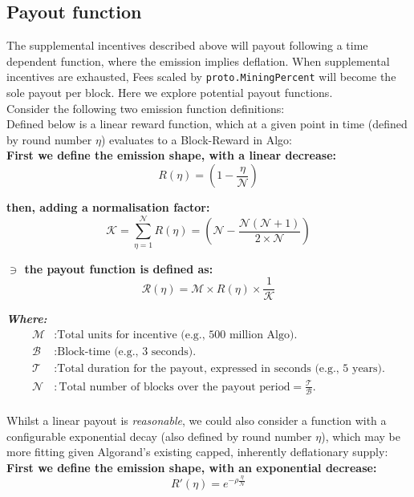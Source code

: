 \documentclass[11pt,a4paper]{article}
\begin{document}
\pagebreak

\subsection{Payout function}
The supplemental incentives described above will payout following a time dependent function, where the emission implies 
deflation. When supplemental incentives are exhausted, Fees scaled by \texttt{proto.MiningPercent} will become the sole 
payout per block. Here we explore potential payout functions. \\

Consider the following two emission function definitions: \\

Defined below is a linear reward function, which at a given point in time (defined by round number $\eta$) evaluates to 
a \gls{Block-Reward} in Algo:\\

\textbf{First we define the emission shape, with a linear decrease:}
\[
R(\eta) = (1- \frac{\eta}{\mathcal{N}})
\]

\textbf{then, adding a normalisation factor:}
\[
\mathcal{K} = \sum_{\eta=1}^\mathcal{N}R(\eta)=(\mathcal{N} -  \frac{\mathcal{N}(\mathcal{N}+1)}{2\times \mathcal{N}})  
\]

\textbf{$\ni$ the payout function is defined as:}
\[
\mathcal{R}(\eta) = \mathcal{M} \times R(\eta) \times \frac{1}{\mathcal{K}}
\]

\textbf{\emph{Where:}}
\begin{align*}
    \mathcal{M} & : \text{Total units for incentive (e.g., 500 million Algo).} \\
    \mathcal{B} & : \text{Block-time (e.g., 3 seconds).} \\
    \mathcal{T} & : \text{Total duration for the payout, expressed in seconds (e.g., 5 years).} \\
    \mathcal{N} & : \text{Total number of blocks over the payout period} = \frac{\mathcal{T}}{\mathcal{B}}.\\
\end{align*}

Whilst a linear payout is \textit{reasonable}, we could also consider a function with a configurable exponential decay 
(also defined by round number $\eta$), which may be more fitting given Algorand's existing capped, inherently 
deflationary supply: \\ 

\textbf{First we define the emission shape, with an exponential decrease:}
\[
R'(\eta)= e^{-\rho\frac{\eta}{\mathcal{N}}}
\]
\end{document}
